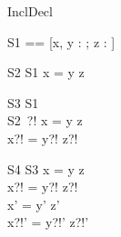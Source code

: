 \begin{zsection}
  \SECTION InclDecl
\end{zsection}

\begin{zed}
  S1 == [x, y : \nat; z : \power \nat]
\end{zed}

\begin{schema}{S2}
  S1
\where
  x = y \in z
\end{schema} 

\begin{schema}{S3}
  S1\\
  S2~?!
\where
  x = y \in z\\
  x?! = y?! \in z?!
\end{schema}

\begin{schema}{S4}
  \Delta S3
\where
  x = y \in z\\
  x?! = y?! \in z?!\\
  x' = y' \in z'\\
  x?!' = y?!' \in z?!'
\end{schema}

